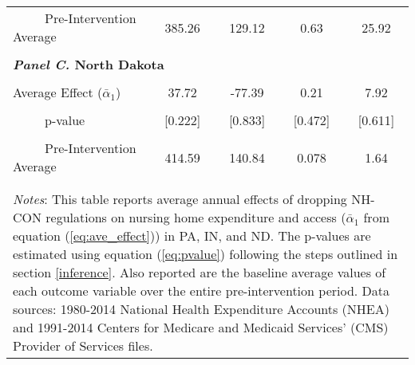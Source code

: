 \documentclass[../Main.tex]{subfiles}
\begin{document}
\begin{table}[htbp]
\begin{tabular}{l*{4}{c}}
\\[-2ex]
\multicolumn{1}{l}{\ \ \ \ \ Pre-Intervention Average}&   \multicolumn{1}{c}{385.26}&   \multicolumn{1}{c}{129.12}&   \multicolumn{1}{c}{0.63}&   \multicolumn{1}{c}{25.92}\\
\\[-.1ex]
\multicolumn{5}{l}{\textbf{\textit{Panel C.} North Dakota}}\\
\\[-1.5ex]
\multicolumn{1}{l}{Average Effect ($\bar{\alpha}_1$)}&   \multicolumn{1}{c}{37.72}&   \multicolumn{1}{c}{-77.39}&  \multicolumn{1}{c}{0.21}&   \multicolumn{1}{c}{7.92}\\
\\[-2ex]
\multicolumn{1}{l}{\ \ \ \ \ p-value}  &\multicolumn{1}{c}{[0.222]}&\multicolumn{1}{c}{[0.833]}&\multicolumn{1}{c}{[0.472]}&\multicolumn{1}{c}{[0.611]}\\
\\[-2ex]
\multicolumn{1}{l}{\ \ \ \ \ Pre-Intervention Average}&   \multicolumn{1}{c}{414.59}&   \multicolumn{1}{c}{140.84}&   \multicolumn{1}{c}{0.078}&   \multicolumn{1}{c}{1.64}\\
\\[-.1ex]
\hline\hline
\\[-2ex]
\multicolumn{5}{p{.93\linewidth}}{\footnotesize \textit{Notes}: This table reports average annual effects of dropping NH-CON regulations on nursing home expenditure and access ($\bar{\alpha}_1$ from equation (\ref{eq:ave_effect})) in PA, IN, and ND. The p-values are estimated using equation (\ref{eq:pvalue}) following the steps outlined in section \ref{inference}. Also reported are the baseline average values of each outcome variable over the entire pre-intervention period. Data sources: 1980-2014 National Health Expenditure Accounts (NHEA) and 1991-2014 Centers for Medicare and Medicaid Services’ (CMS) Provider of Services files.}
\end{tabular}
\end{table}
\vfill
\clearpage
\end{document}
